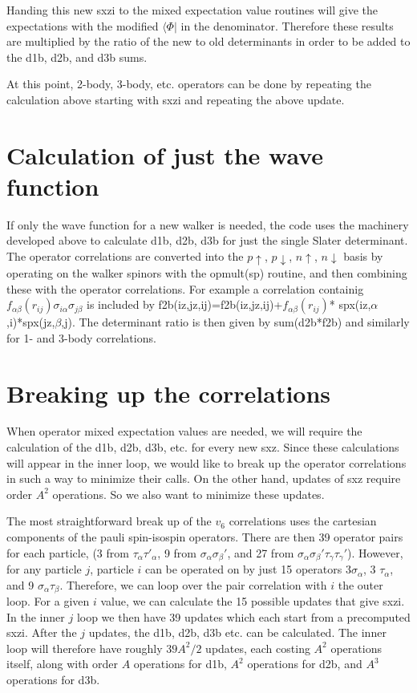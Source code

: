 \documentclass[12pt]{article}
\begin{document}
Handing this new sxzi to the mixed expectation value routines will
give the expectations with the modified $\langle \Phi|$ in the denominator.
Therefore these results are multiplied by the ratio of the new to old
determinants in order to be added to the d1b, d2b, and d3b sums.

At this point, 2-body, 3-body, etc. operators can be done by repeating
the calculation above starting with sxzi and repeating the above update.

\section{Calculation of just the wave function}
If only the wave function for a new walker is needed, the code uses
the machinery developed above to calculate d1b, d2b, d3b for just
the single Slater determinant. The operator correlations are
converted into the $p\uparrow$, $p\downarrow$, $n\uparrow$, $n\downarrow$
basis by operating on the walker spinors with the opmult(sp) routine,
and then combining these with the operator correlations. For example
a correlation containig $f_{\alpha \beta}(r_{ij})
\sigma_{i\alpha}\sigma_{j\beta}$
is included by f2b(iz,jz,ij)=f2b(iz,jz,ij)+$f_{\alpha\beta}(r_{ij})$*
spx(iz,$\alpha$,i)*spx(jz,$\beta$,j). The determinant ratio is
then given by sum(d2b*f2b) and similarly for 1- and 3-body correlations.

\section{Breaking up the correlations}
When operator mixed expectation values are needed, we will require
the calculation of the d1b, d2b, d3b, etc. for every new sxz. Since
these calculations will appear in the inner loop, we would like to
break up the operator correlations in such a way to minimize their
calls. On the other hand, updates of sxz require order $A^2$ operations.
So we also want to minimize these updates.

The most straightforward
break up of the $v_6$ correlations uses the cartesian components of
the pauli spin-isospin operators. There are then 39 operator pairs
for each particle, (3 from $\tau_\alpha \tau'_\alpha$, 9 from
$\sigma_\alpha \sigma_\beta'$, and 27 from $\sigma_\alpha\sigma_\beta'
\tau_\gamma\tau_\gamma'$). However, for any particle $j$, particle
$i$ can be operated on by just 15 operators $3 \sigma_\alpha$,
3 $\tau_\alpha$, and 9 $\sigma_\alpha\tau_\beta$. Therefore, we can loop
over the pair correlation with $i$ the outer loop. For a given $i$
value, we can calculate the 15 possible updates that give sxzi.
In the inner $j$ loop we then have 39 updates which each start from
a precomputed sxzi. After the $j$ updates, the d1b, d2b, d3b etc. can
be calculated. The inner loop will therefore have roughly $39A^2/2$
updates, each costing $A^2$ operations itself, along with order
$A$ operations for d1b, $A^2$ operations for d2b, and $A^3$ operations for d3b.
\end{document}
